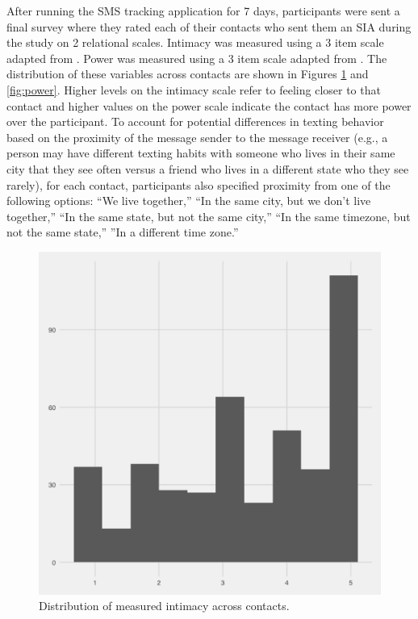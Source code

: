 \documentclass[12pt]{nuthesis}	%
\begin{document}
After running the SMS tracking application for 7 days, participants were sent a final survey where they rated each of their contacts who sent them an SIA during the study on 2 relational scales. Intimacy was measured using a 3 item scale adapted from \citet{miller1982assessment}. Power was measured using a 3 item scale adapted from \citet{farrell2015relationship}. The distribution of these variables across contacts are shown in Figures \ref{fig:intimacy} and \ref{fig:power}. Higher levels on the intimacy scale refer to feeling closer to that contact and higher values on the power scale indicate the contact has more power over the participant.  To account for potential differences in texting behavior based on the proximity of the message sender to the message receiver (e.g., a person may have different texting habits with someone who lives in their same city that they see often versus a friend who lives in a different state who they see rarely), for each contact, participants also specified proximity from one of the following options: ``We live together,'' ``In the same city, but we don't live together,'' ``In the same state, but not the same city,'' ``In the same timezone, but not the same state,'' ''In a different time zone.''


\begin{figure}[h]
\centering
\includegraphics[width=.7\textwidth]{figures/intimacy_distribution}
\caption{Distribution of measured intimacy across contacts.}
\label{fig:intimacy}
\end{figure}
\end{document}
